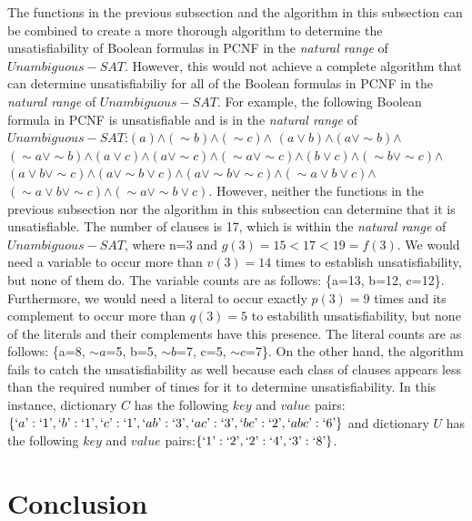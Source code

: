 \documentclass[runningheads,a4paper]{llncs}
\let\oldsim\sim
\renewcommand{\sim}{{\oldsim}}
\begin{document}
The functions in the previous subsection and the algorithm in this subsection can be combined to create a more thorough algorithm to determine the unsatisfiability of Boolean formulas in PCNF in the \emph{natural range} of ${Unambiguous-SAT}$. However, this would not achieve a complete algorithm that can determine unsatisfiabiliy for all of the Boolean formulas in PCNF in the \emph{natural range} of ${Unambiguous-SAT}$. For example, the following Boolean formula in PCNF is unsatisfiable and is in the \emph{natural range} of ${Unambiguous-SAT}$:$({a})$$\wedge$$(\sim{b})$$\wedge$$(\sim{c})$$\wedge$ $({a}\vee {b})$$\wedge$$({a}\vee \sim {b})$$\wedge$$(\sim {a}\vee \sim {b})$$\wedge$$({a}\vee {c})$$\wedge$$({a}\vee \sim {c})$$\wedge$$(\sim {a}\vee \sim {c})$$\wedge$$({b}\vee {c})$$\wedge$$(\sim {b}\vee \sim {c})$$\wedge$ $({a}\vee {b} \vee \sim {c})$$\wedge$$({a}\vee \sim {b} \vee {c})$$\wedge$$({a}\vee \sim {b} \vee \sim {c})$$\wedge$$(\sim {a}\vee {b} \vee {c})$$\wedge$$(\sim {a}\vee {b} \vee \sim {c})$$\wedge$$( \sim {a}\vee \sim {b} \vee {c})$. However, neither the functions in the previous subsection nor the algorithm in this subsection can determine that it is unsatisfiable. The number of clauses is 17, which is within the \emph{natural range} of ${Unambiguous-SAT}$, where n=3 and $g(3)=15<17<19=f(3)$. We would need a variable to occur more than $v(3)=14$ times to establish unsatisfiability, but none of them do. The variable counts are as follows: \{a=13, b=12, c=12\}. Furthermore, we would need a literal to occur exactly $p(3)=9$ times and its complement to occur more than $q(3)=5$ to estabilith unsatisfiability, but none of the literals and their complements have this presence. The literal counts are as follows: \{a=8, $\sim{a}$=5, b=5, $\sim{b}$=7, c=5, $\sim{c}$=7\}. On the other hand, the algorithm fails to catch the unsatisfiability as well because each class of clauses appears less than the required number of times for it to determine unsatisfiability. In this instance, dictionary $C$ has the following $key$ and $value$ pairs:$ \{`a\textrm':`1\textrm',`b\textrm':`1\textrm',`c\textrm':`1\textrm',`ab\textrm':`3\textrm', `ac\textrm':`3\textrm', `bc\textrm':`2\textrm', `abc\textrm':`6\textrm'\}$ and dictionary $U$ has the following $key$ and $value$ pairs:$\{`1\textrm':`2\textrm',`2\textrm':`4\textrm',`3\textrm':`8\textrm'\}$.


\section{Conclusion}
\end{document}
